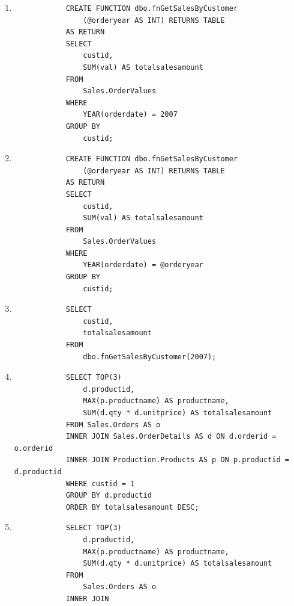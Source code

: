 \documentclass[12pt,titlepage]{article}
\begin{document}
\begin{enumerate}
{    }
    \item {
        \begin{verbatim}
            CREATE FUNCTION dbo.fnGetSalesByCustomer
                (@orderyear AS INT) RETURNS TABLE
            AS RETURN
            SELECT
                custid,
                SUM(val) AS totalsalesamount
            FROM 
                Sales.OrderValues
            WHERE
                YEAR(orderdate) = 2007
            GROUP BY
                custid;
        \end{verbatim}
    }
    \item {
        \begin{verbatim}
            CREATE FUNCTION dbo.fnGetSalesByCustomer
                (@orderyear AS INT) RETURNS TABLE
            AS RETURN
            SELECT
                custid,
                SUM(val) AS totalsalesamount
            FROM
                Sales.OrderValues
            WHERE
                YEAR(orderdate) = @orderyear
            GROUP BY
                custid;
        \end{verbatim}
    }
    \pagebreak
    \item {
        \begin{verbatim}
            SELECT
                custid, 
                totalsalesamount
            FROM
                dbo.fnGetSalesByCustomer(2007);
        \end{verbatim}
    }
    \item {
        \begin{verbatim}
            SELECT TOP(3)
                d.productid,
                MAX(p.productname) AS productname,
                SUM(d.qty * d.unitprice) AS totalsalesamount
            FROM Sales.Orders AS o
            INNER JOIN Sales.OrderDetails AS d ON d.orderid = o.orderid
            INNER JOIN Production.Products AS p ON p.productid = d.productid
            WHERE custid = 1
            GROUP BY d.productid
            ORDER BY totalsalesamount DESC;
        \end{verbatim}
    }
    \item {
        \begin{verbatim}
            SELECT TOP(3)
                d.productid,
                MAX(p.productname) AS productname,
                SUM(d.qty * d.unitprice) AS totalsalesamount
            FROM 
                Sales.Orders AS o
            INNER JOIN

\end{verbatim}}
\end{enumerate}
\end{document}
